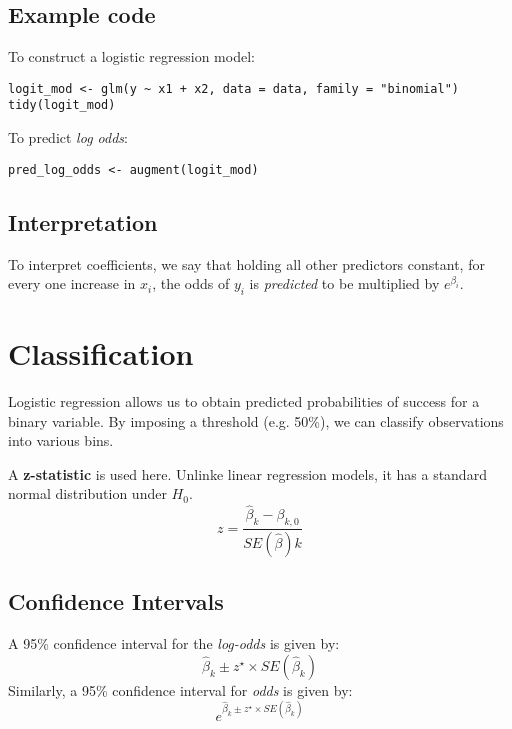 \documentclass[titlepage, 12pt, leqno]{article}
\begin{document}
\subsection{Example code}
To construct a logistic regression model:
\begin{verbatim}
logit_mod <- glm(y ~ x1 + x2, data = data, family = "binomial")
tidy(logit_mod)
\end{verbatim}

To predict \textit{log odds}:
\begin{verbatim}
pred_log_odds <- augment(logit_mod)
\end{verbatim}

\subsection{Interpretation}
To interpret coefficients, we say that holding all other predictors constant, for
every one increase in $x_i$, the odds of $y_i$ is \textit{predicted} to be
multiplied by $e^{\beta_i}$.

\pagebreak
\section{Classification}
Logistic regression allows us to obtain predicted probabilities of success for a
binary variable. By imposing a threshold (e.g. 50\%), we can classify observations
into various bins.

\begin{definition}
    A \textbf{z-statistic} is used here. Unlinke linear regression models, it has
    a standard normal distribution under $H_0$.
    \[
        z = \frac{\hat\beta_k - \beta_{k,0}}{SE(\hat\beta)k}
    \]
\end{definition}

\subsection{Confidence Intervals}
A 95\% confidence interval for the \textit{log-odds} is given by:
\[
\hat \beta_k \pm z^\star \times SE(\hat \beta_k)
\]
Similarly, a 95\% confidence interval for \textit{odds} is given by:
\[
    e^{\hat \beta_k \pm z^\star \times SE(\hat \beta_k)}
\]
\end{document}
